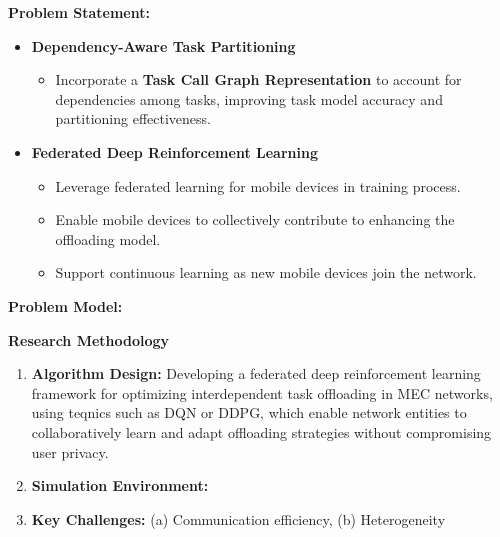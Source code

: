 \documentclass[12pt]{article}
\begin{document}
	
	\vspace{3mm}
	
	\noindent\textbf{\large Problem Statement: }
	
	
	\vspace{0mm}
	\begin{itemize}
		\item \textbf{Dependency-Aware Task Partitioning}\vspace{-2mm}
		\begin{itemize}
			\item Incorporate a \textbf{Task Call Graph Representation} to account for dependencies among tasks, improving task model accuracy and partitioning effectiveness.
		\end{itemize}
		\vspace{-3mm}
		\item \textbf{Federated Deep Reinforcement Learning}\vspace{-2mm}
		\begin{itemize}
			\item Leverage federated learning for mobile devices in training process. \vspace{-2mm}
			\item Enable mobile devices to collectively contribute to enhancing the offloading model.\vspace{-2mm}
			\item Support continuous learning as new mobile devices join the network.\vspace{-2mm}
		\end{itemize}
	\end{itemize}
	
	\vspace{3mm}
	
	\noindent\textbf{\large Problem Model: } 
	\noindent
	
	
	
	\vspace{5mm}
	
	\noindent\textbf{\large Research Methodology}
	
	\begin{enumerate} \item \textbf{Algorithm Design:} Developing a federated deep reinforcement learning framework for optimizing interdependent task offloading in MEC networks, using teqnics such as DQN or DDPG, which enable network entities to collaboratively learn and adapt offloading strategies without compromising user privacy. \item \textbf{Simulation Environment:}  \item \textbf{Key Challenges:} (a) Communication efficiency, (b) Heterogeneity  
	\end{enumerate}
	




\end{document}

